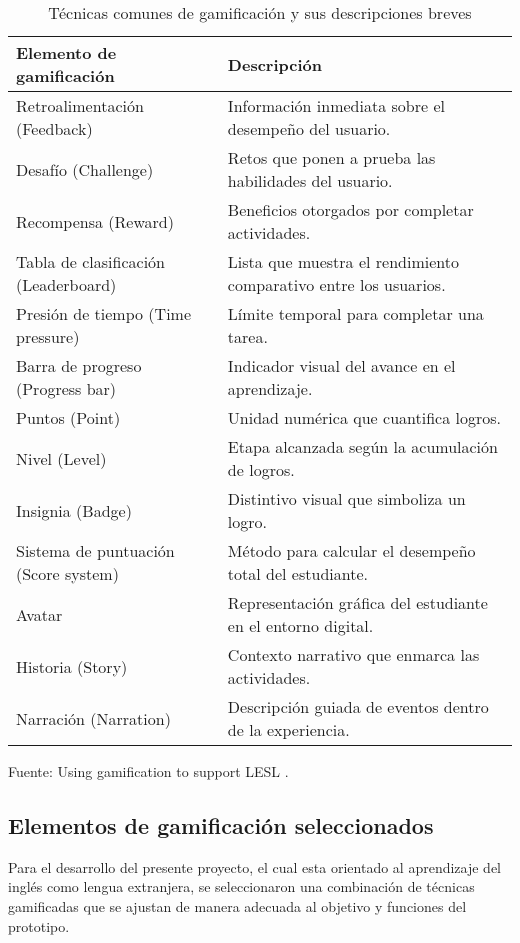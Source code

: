 \begin{table}[H]
\centering
\begin{tabular}{|l|p{10cm}|}
\hline
\textbf{Elemento de gamificación} & \textbf{Descripci\'on} \\ \hline
Retroalimentaci\'on (Feedback) & Informaci\'on inmediata sobre el desempe\~no del usuario. \\ \hline
Desaf\'io (Challenge) & Retos que ponen a prueba las habilidades del usuario. \\ \hline
Recompensa (Reward) & Beneficios otorgados por completar actividades. \\ \hline
Tabla de clasificaci\'on (Leaderboard) & Lista que muestra el rendimiento comparativo entre los usuarios. \\ \hline
Presi\'on de tiempo (Time pressure) & L\'imite temporal para completar una tarea. \\ \hline
Barra de progreso (Progress bar) & Indicador visual del avance en el aprendizaje. \\ \hline
Puntos (Point) & Unidad num\'erica que cuantifica logros. \\ \hline
Nivel (Level) & Etapa alcanzada seg\'un la acumulaci\'on de logros. \\ \hline
Insignia (Badge) & Distintivo visual que simboliza un logro. \\ \hline
Sistema de puntuaci\'on (Score system) & M\'etodo para calcular el desempe\~no total del estudiante. \\ \hline
Avatar & Representaci\'on gr\'afica del estudiante en el entorno digital. \\ \hline
Historia (Story) & Contexto narrativo que enmarca las actividades. \\ \hline
Narraci\'on (Narration) & Descripci\'on guiada de eventos dentro de la experiencia. \\ \hline
\end{tabular}
\caption{Técnicas comunes de gamificación y sus descripciones breves}
Fuente: Using gamification
to support LESL \cite{Dehghanzadeh2021}.
\end{table}


\subsection{Elementos de gamificación seleccionados}

Para el desarrollo del presente proyecto, el cual esta orientado al aprendizaje del inglés como lengua extranjera, se seleccionaron una combinación de técnicas gamificadas que se ajustan de manera adecuada al objetivo y funciones del prototipo.

